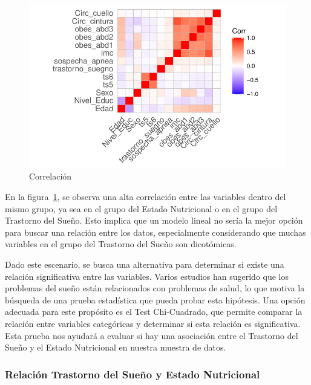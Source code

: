 \documentclass[
  10pt,
  letterpaper,
  DIV=11,
  numbers=noendperiod,
  twocolumn]{scrartcl}
\begin{document}
\begin{figure}[H]

{\centering \includegraphics{informe_estadistico_files/figure-pdf/fig-f6-1.pdf}

}

\caption{\label{fig-f6}Correlación}

\end{figure}

En la figura~\ref{fig-f6}, se observa una alta correlación entre las
variables dentro del mismo grupo, ya sea en el grupo del Estado
Nutricional o en el grupo del Trastorno del Sueño. Esto implica que un
modelo lineal no sería la mejor opción para buscar una relación entre
los datos, especialmente considerando que muchas variables en el grupo
del Trastorno del Sueño son dicotómicas.

Dado este escenario, se busca una alternativa para determinar si existe
una relación significativa entre las variables. Varios estudios han
sugerido que los problemas del sueño están relacionados con problemas de
salud, lo que motiva la búsqueda de una prueba estadística que pueda
probar esta hipótesis. Una opción adecuada para este propósito es el
Test Chi-Cuadrado, que permite comparar la relación entre variables
categóricas y determinar si esta relación es significativa. Esta prueba
nos ayudará a evaluar si hay una asociación entre el Trastorno del Sueño
y el Estado Nutricional en nuestra muestra de datos.

\hypertarget{relaciuxf3n-trastorno-del-sueuxf1o-y-estado-nutricional}{%
\subsubsection{Relación Trastorno del Sueño y Estado
Nutricional}\label{relaciuxf3n-trastorno-del-sueuxf1o-y-estado-nutricional}}
\end{document}
